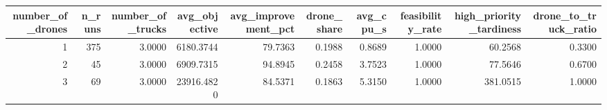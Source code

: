 \begin{tabular}{rrrrrrrrrr}
\toprule
number_of_drones & n_runs & number_of_trucks & avg_objective & avg_improvement_pct & drone_share & avg_cpu_s & feasibility_rate & high_priority_tardiness & drone_to_truck_ratio \\
\midrule
1 & 375 & 3.0000 & 6180.3744 & 79.7363 & 0.1988 & 0.8689 & 1.0000 & 60.2568 & 0.3300 \\
2 & 45 & 3.0000 & 6909.7315 & 94.8945 & 0.2458 & 3.7523 & 1.0000 & 77.5646 & 0.6700 \\
3 & 69 & 3.0000 & 23916.4820 & 84.5371 & 0.1863 & 5.3150 & 1.0000 & 381.0515 & 1.0000 \\
\bottomrule
\end{tabular}
